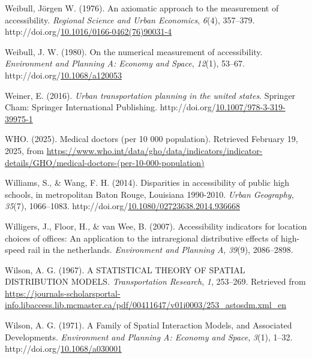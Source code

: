 \documentclass[
11pt, %
oneside, %
english, %
singlespacing, %
]{macthesis} %
\newlength{\cslhangindent}
\newenvironment{CSLReferences}[2] %
{\begin{list}{}{%
	\setlength{\itemindent}{0pt}
	\setlength{\leftmargin}{0pt}
	\setlength{\parsep}{0pt}
	\ifodd #1
	\setlength{\leftmargin}{\cslhangindent}
	\setlength{\itemindent}{-1\cslhangindent}
	\fi
	\setlength{\itemsep}{#2\baselineskip}}}
{\end{list}}
\begin{document}
\begin{CSLReferences}{1}{0}
Weibull, Jörgen W. (1976). An axiomatic approach to the measurement of accessibility. \emph{Regional Science and Urban Economics}, \emph{6}(4), 357--379. http://doi.org/\href{https://doi.org/10.1016/0166-0462(76)90031-4}{10.1016/0166-0462(76)90031-4}

Weibull, J. W. (1980). On the numerical measurement of accessibility. \emph{Environment and Planning A: Economy and Space}, \emph{12}(1), 53--67. http://doi.org/\href{https://doi.org/10.1068/a120053}{10.1068/a120053}

Weiner, E. (2016). \emph{Urban transportation planning in the united states}. Springer Cham: Springer International Publishing. http://doi.org/\href{https://doi.org/10.1007/978-3-319-39975-1}{10.1007/978-3-319-39975-1}

WHO. (2025). Medical doctors (per 10 000 population). Retrieved February 19, 2025, from \url{https://www.who.int/data/gho/data/indicators/indicator-details/GHO/medical-doctors-(per-10-000-population)}

Williams, S., \& Wang, F. H. (2014). Disparities in accessibility of public high schools, in metropolitan {Baton} {Rouge}, {Louisiana} 1990-2010. \emph{Urban Geography}, \emph{35}(7), 1066--1083. http://doi.org/\href{https://doi.org/10.1080/02723638.2014.936668}{10.1080/02723638.2014.936668}

Willigers, J., Floor, H., \& van Wee, B. (2007). Accessibility indicators for location choices of offices: An application to the intraregional distributive effects of high-speed rail in the netherlands. \emph{Environment and Planning A}, \emph{39}(9), 2086--2898.

Wilson, A. G. (1967). A {STATISTICAL} {THEORY} {OF} {SPATIAL} {DISTRIBUTION} {MODELS}. \emph{Transportation Research}, \emph{1}, 253--269. Retrieved from \url{https://journals-scholarsportal-info.libaccess.lib.mcmaster.ca/pdf/00411647/v01i0003/253_astosdm.xml_en}

Wilson, A. G. (1971). A Family of Spatial Interaction Models, and Associated Developments. \emph{Environment and Planning A: Economy and Space}, \emph{3}(1), 1--32. http://doi.org/\href{https://doi.org/10.1068/a030001}{10.1068/a030001}


\end{CSLReferences}
\end{document}
